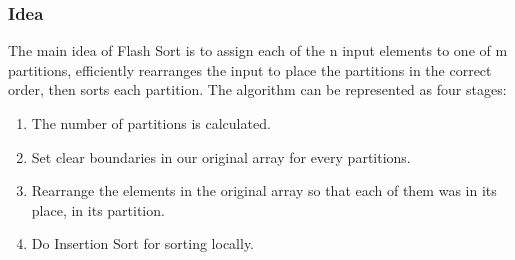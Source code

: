 \documentclass[11pt,a4paper]{article}
\begin{document}
\subsubsection*{Idea}
The main idea of Flash Sort is to assign each of the n input elements to one of m partitions, 
efficiently rearranges the input to place the partitions in the correct order, then sorts each partition.
\newline
\newline
The algorithm can be represented as four stages:
\begin{enumerate}
  \item The number of partitions is calculated.
  \item Set clear boundaries in our original array for every partitions.
  \item Rearrange the elements in the original array so that each of them was in its place, 
  in its partition.
  \item Do Insertion Sort for sorting locally.
\end{enumerate}
\end{document}
